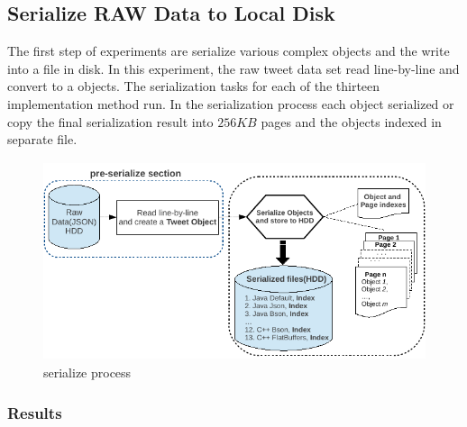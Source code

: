 \subsection{Serialize RAW Data to Local Disk}

The first step of experiments are serialize various complex objects and the write into a file in disk. In this experiment, the raw tweet data set read line-by-line and convert to a objects. The serialization tasks for each of the thirteen implementation method run. In the serialization process each object serialized or copy the final serialization result into $256KB$ pages and the objects indexed in separate file.

%		

\begin{figure}
	\centering
	\includegraphics[width=\columnwidth,height=2.3in,keepaspectratio]{img/serialize_process.pdf}
	\caption{serialize process}
	\label{fig:serialize_process}
\end{figure}

\subsubsection{Results}

